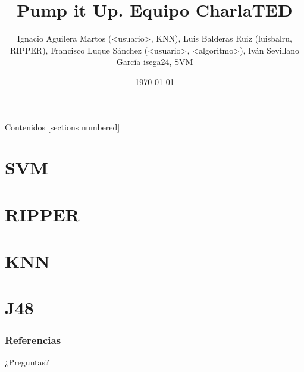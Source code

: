 \documentclass[10pt]{beamer}
\title{Pump it Up. Equipo CharlaTED}
\author{Ignacio Aguilera Martos (<usuario>, KNN), Luis Balderas Ruiz (luisbalru, RIPPER), Francisco Luque Sánchez (<usuario>, <algoritmo>), Iván Sevillano García isega24, SVM}
\date{\today}
\institute{Preprocesamiento y Clasificación}
\begin{document}
\maketitle

\begin{frame}[fragile]{Contenidos}
[sections numbered]
\tableofcontents[hideallsubsections]
\end{frame}

\section{SVM}


\section{RIPPER}


\section{KNN}


\section{J48}


\begin{frame}[allowframebreaks]
\frametitle{Referencias}
\nocite{*}


\end{frame}

\begin{frame}[standout]
\LARGE{¿Preguntas?}
\vspace{10px}

\end{frame}
\end{document}
